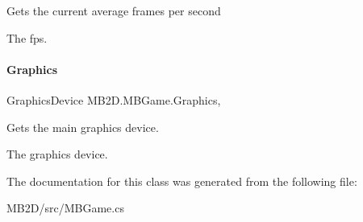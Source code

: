 Gets the current average frames per second 

The fps.\hypertarget{class_m_b2_d_1_1_m_b_game_ab46479cca47c2d5da6528ef81e9ff7c1}{}\label{class_m_b2_d_1_1_m_b_game_ab46479cca47c2d5da6528ef81e9ff7c1} 
\paragraph{\texorpdfstring{Graphics}{Graphics}}
{\footnotesize\ttfamily Graphics\+Device M\+B2\+D.\+M\+B\+Game.\+Graphics\hspace{0.3cm}{\ttfamily [static]}, {\ttfamily [get]}}



Gets the main graphics device. 

The graphics device.

The documentation for this class was generated from the following file\+:\begin{DoxyCompactItemize}
\item 
M\+B2\+D/src/M\+B\+Game.\+cs\end{DoxyCompactItemize}
